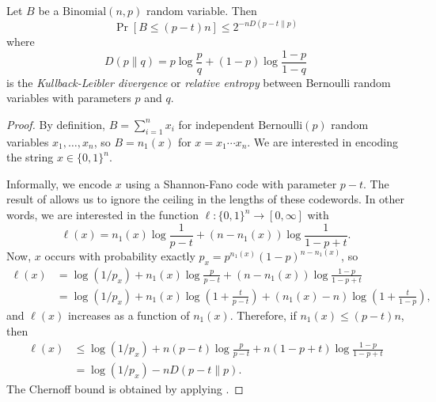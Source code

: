 \begin{thm:chernoff}
  Let $B$ be a $\text{Binomial}(n, p)$ random variable. Then
  \[
  \Pr[B \leq (p - t)n] \leq 2^{-n D(p - t \| p)}
  \]
  where
  \[D(p \| q) = p \log \frac{p}{q} + (1 - p) \log \frac{1 - p}{1 -
    q}\]
  is the \emph{Kullback-Leibler divergence} or \emph{relative entropy}
  between Bernoulli random variables with parameters $p$ and $q$.
\end{thm:chernoff}
\begin{proof}
  By definition, $B = \sum_{i = 1}^n x_i$ for independent
  $\text{Bernoulli}(p)$ random variables $x_1, \ldots, x_n$, so $B =
  n_1(x)$ for $x = x_1 \cdots x_n$. We are interested in encoding the
  string $x \in \{0, 1\}^n$.

  Informally, we encode $x$ using a Shannon-Fano code with parameter
  $p - t$. The result of  allows us to
  ignore the ceiling in the lengths of these codewords. In other
  words, we are interested in the function
  $\ell : \{0, 1\}^n \to [0, \infty]$ with
  \[
  \ell(x) = n_1(x) \log \frac{1}{p - t} + (n - n_1(x)) \log \frac{1}{1 - p + t} .
  \]
  Now, $x$ occurs with probability exactly
  $p_x = p^{n_1(x)} (1 - p)^{n - n_1(x)}$, so
  \begin{align*}
    \ell(x) &= \log(1/p_x) + n_1(x) \log \frac{p}{p - t} + (n - n_1(x)) \log \frac{1 - p}{1 - p + t} \\
    &= \log (1/p_x) + n_1(x) \log \left(1 + \frac{t}{p - t}\right) + (n_1(x) - n) \log \left(1 + \frac{t}{1 - p}\right) ,
  \end{align*}
  and $\ell(x)$ increases as a function of $n_1(x)$. Therefore, if
  $n_1(x) \le (p - t)n$, then
  \begin{align*}
    \ell(x) &\le \log (1/p_x) + n (p - t) \log \frac{p}{p - t} + n (1 - p + t) \log \frac{1 - p}{1 - p + t} \\
            &= \log (1/p_x) - n D(p - t \| p) .
  \end{align*}
  The Chernoff bound is obtained by applying .

\end{proof}
